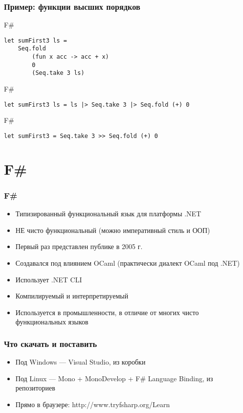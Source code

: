 \documentclass[xetex,mathserif,serif]{beamer}
\begin{document}
	\begin{frame}[fragile]
		\frametitle{Пример: функции высших порядков}
		\begin{exampleblock}{F\#}
			\begin{lstlisting}
let sumFirst3 ls = 
    Seq.fold 
        (fun x acc -> acc + x) 
        0 
        (Seq.take 3 ls)
            \end{lstlisting}
		\end{exampleblock}
		\begin{exampleblock}{F\#}
			\begin{lstlisting}
let sumFirst3 ls = ls |> Seq.take 3 |> Seq.fold (+) 0
            \end{lstlisting}
		\end{exampleblock}
		\begin{exampleblock}{F\#}
			\begin{lstlisting}
let sumFirst3 = Seq.take 3 >> Seq.fold (+) 0
            \end{lstlisting}
		\end{exampleblock}
\end{frame}

	\section{F\#}
	
	\begin{frame}
		\frametitle{F\#}
		\begin{itemize}
			\item Типизированный функциональный язык для платформы .NET
			\item НЕ чисто функциональный (можно императивный стиль и ООП)
			\item Первый раз представлен публике в 2005 г.
			\item Создавался под влиянием OCaml (практически диалект OCaml под .NET)
			\item Использует .NET CLI
			\item Компилируемый и интерпретируемый
			\item Используется в промышленности, в отличие от многих чисто функциональных языков
		\end{itemize}
	\end{frame}

	\begin{frame}
		\frametitle{Что скачать и поставить}
		\begin{itemize}
			\item Под Windows --- Visual Studio, из коробки
			\item Под Linux --- Mono + MonoDevelop + F\# Language Binding, из репозиториев
			\item Прямо в браузере: http://www.tryfsharp.org/Learn
		\end{itemize}
	\end{frame}
	
\end{document}

